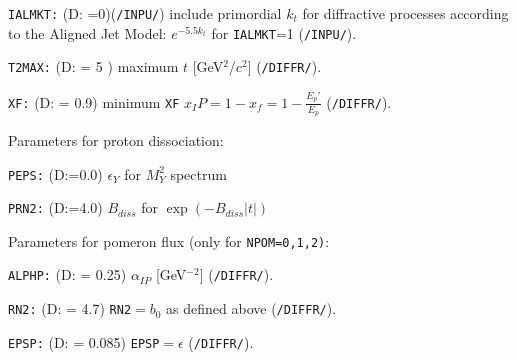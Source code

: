 \documentclass[10pt]{article} \usepackage{dina4}
\newcommand{\PO}{\ensuremath{ I\! \! P} }
\newcommand{\pom}{I\!\!P}
\newcommand{\deflab}[1]{#1\hfil}%
\newenvironment{defl}[1]%
  {\begin{list}{}{\settowidth{\labelwidth}{#1}%
  \setlength{\leftmargin}{\labelwidth}%
  \addtolength{\leftmargin}{\labelsep}%
  \setlength{\itemsep}{0pt plus 1pt}
  \setlength{\parsep}{0pt plus 1pt}
  \setlength{\topsep}{0pt plus 1pt}
  \setlength{\partopsep}{0pt plus 1pt}
  \setlength{\parskip}{2mm plus 1mm minus 1mm}
  \let\makelabel\deflab}}%
  {\end{list}}
\begin{document}
\begin{defl}{123456789012345}
\item[{\tt IALMKT:}] (D: =0)(\verb+/INPU/+)
                   include primordial $k_t$ for diffractive processes
                   according to the Aligned Jet Model:   
                   $e^{-5.5 k_t}$ for \verb+IALMKT+=1 (\verb+/INPU/+).

\item[{\tt T2MAX:}] (D: = 5 ) 
                        maximum $t$  [GeV$^2$/$c^2$] (\verb+/DIFFR/+).

\item[{\tt XF:}]  (D: = 0.9)
                        minimum \verb+XF+ $x_\pom=1-x_f=1-\frac{E_p'}{E_{p}}$ 
				(\verb+/DIFFR/+).
\item[Parameters for proton dissociation:] 	
\item[{\tt PEPS:}] (D:=0.0) $\epsilon_Y$ for $M_Y^2$ spectrum
\item[{\tt PRN2:}] (D:=4.0) $B_{diss}$ for $\exp(-B_{diss} |t|)$
\item[Parameters for pomeron flux (only for {\tt NPOM=0,1,2)}:] 				
\item[{\tt ALPHP:}]
 (D: = 0.25) $\alpha_{\PO}$ [GeV$^{-2}$] (\verb+/DIFFR/+).
\item[{\tt RN2:}] (D: = 4.7)
                        \verb+RN2+$=b_0$ as defined above (\verb+/DIFFR/+).
\item[{\tt EPSP:}]
 (D: = 0.085) \verb+EPSP+$=\epsilon$ (\verb+/DIFFR/+). 


                       
\end{defl}
\end{document}
